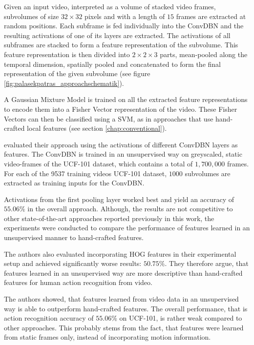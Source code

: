 Given an input video, interpreted as a volume of stacked video frames, subvolumes of size $32 \times 32$ pixels and with a length of $15$ frames are extracted at random positions.
Each subframe is fed individually into the ConvDBN and the resulting activations of one of its layers are extracted.
The activations of all subframes are stacked to form a feature representation of the subvolume.
This feature representation is then divided into $2 \times 2 \times 3$ parts, mean-pooled along the temporal dimension, spatially pooled and concatenated to form the final representation of the given subvolume (see figure \ref{fig:palasekpatras_approachschematik}). \cite{lee_convolutional_2009-1}

A Gaussian Mixture Model is trained on all the extracted feature representations to encode them into a Fisher Vector representation of the video.
These Fisher Vectors can then be classified using a SVM, as in approaches that use hand-crafted local features (see section \ref{chap:conventional}).
 
\textcite{palasek_action_2016} evaluated their approach using the activations of different ConvDBN layers as features.
The ConvDBN is trained in an unsupervised way on greyscaled, static video-frames of the UCF-101 dataset, which contains a total of $1,700,000$ frames.
For each of the 9537 training videos UCF-101 dataset, $1000$ subvolumes are extracted as training inputs for the ConvDBN.

Activations from the first pooling layer worked best and yield an accuracy of $55.06\%$ in the overall approach.
Although, the results are not competitive to other state-of-the-art approaches reported previously in this work, the experiments were conducted to compare the performance of features learned in an unsupervised manner to hand-crafted features.

The authors also evaluated incorporating HOG features in their experimental setup and achieved significantly worse results: $50.75\%$.
They therefore argue, that features learned in an unsupervised way are more descriptive than hand-crafted features for human action recognition from video.

The authors showed, that features learned from video data in an unsupervised way is able to outperform hand-crafted features.
The overall performance, that is action recognition accuracy of $55.06\%$ on UCF-101, is rather weak compared to other approaches.
This probably stems from the fact, that features were learned from static frames only, instead of incorporating motion information.


